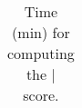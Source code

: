 {\begin{table}[htbp]
\begin{subtable}
{\begin{tabular}{lll}
								\end{tabular} 
							}
											\caption{Time (min) for computing the $\mid$ score. 
												\label{table:LearningTime}}
						\end{subtable}
						
%										
%							
						
					\end{table}


}
